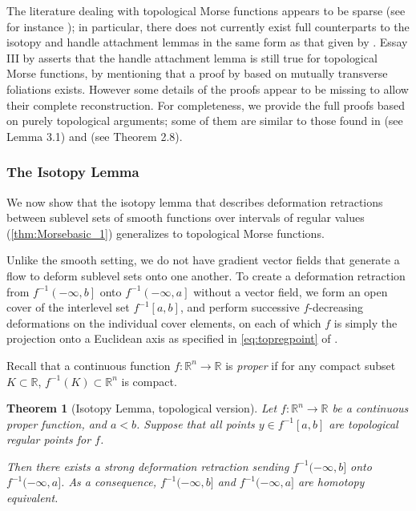 \documentclass[11pt]{article}
\newcommand{\R}{\mathbb{R}}
\newcommand{\sublevel}[2]{{#1}^{-1}\left(-\infty, {#2}\right]}
\newcommand{\intlevel}[3]{{#1}^{-1}\left[{#2}, {#3}\right]}
\theoremstyle{plain}
\newtheorem{thm}{Theorem}
\theoremstyle{definition}
\theoremstyle{remark}
\begin{document}
	
	The literature dealing with topological Morse functions appears to be sparse (see for instance \cite{cantwell_topological_1968,morse_f_1973,landis_tractions_1975}); in particular, there does not currently exist full counterparts to the isotopy and handle attachment lemmas in the same form as that given by \cite{milnor_morse_1963}. Essay III by \cite{kirby_foundational_1977} asserts that the handle attachment lemma is still true for topological Morse functions, by mentioning that a proof by \cite{siebenmann_deformation_1972} based on mutually transverse foliations exists. However some details of the proofs appear to be missing to allow their complete reconstruction.
	For completeness, we provide the full proofs based on purely topological arguments; some of them are similar to those found in \cite{cantwell_topological_1968} (see Lemma 3.1) and \cite{corvellec_deformation_1993} (see Theorem 2.8).
	
	\subsubsection{The Isotopy Lemma}
	
	We now show that the isotopy lemma that describes deformation retractions between sublevel sets of smooth functions over intervals of regular values  (\ref{thm:Morsebasic_1}) generalizes to topological Morse functions. 
	
	Unlike the smooth setting, we do not have gradient vector fields that generate a flow to deform sublevel sets onto one another. To create a deformation retraction from $\sublevel{f}{b}$ onto $\sublevel{f}{a}$ without a vector field, we form an open cover of the interlevel set $\intlevel{f}{a}{b}$, and perform successive $f$-decreasing deformations on the individual cover elements, on each of which $f$ is simply the projection onto a Euclidean axis as specified in \cref{eq:topregpoint} of . 
	
	Recall that a continuous function $f : \R^n \to \R$ is \emph{proper} if for any compact subset $K \subset \R$, $f^{-1}(K) \subset \R^n$ is compact.
	\begin{thm}[Isotopy Lemma, topological version]
		\label{thm:topological_isotopy_lemma}
		Let $f : \R^n \to \R$ be a continuous proper function, and $a < b$. Suppose that all points $y \in f^{-1}[a,b]$ are topological regular points for $f$.
		
		Then there exists a strong deformation retraction sending $f^{-1}(-\infty, b]$ onto $f^{-1}(-\infty, a]$. As a consequence, $f^{-1}(-\infty, b]$ and $f^{-1}(-\infty, a]$ are homotopy equivalent.
	\end{thm}
	
\end{document}

